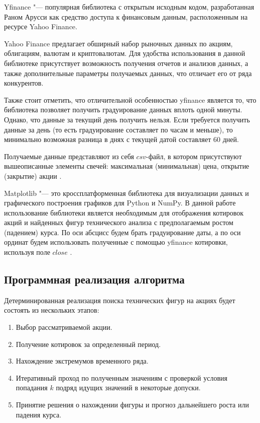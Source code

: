 \documentclass[bachelor, och, coursework]{SCWorks}
\begin{document}
        Yfinance "--- популярная библиотека с открытым исходным кодом,
        разработанная Раном Арусси как средство доступа к финансовым данным,
        расположенным на ресурсе Yahoo Finance.

        Yahoo Finance предлагает обширный набор рыночных данных по акциям,
        облигациям, валютам и криптовалютам. Для удобства использования в данной
        библиотеке присутствует возможность получения отчетов и анализов данных,
        а также дополнительные параметры получаемых данных, что отличает его от
        ряда конкурентов.

        Также стоит отметить, что отличительной особенностью yfinance является
        то, что библиотека позволяет получить градуирование данных вплоть одной
        минуты. Однако, что данные за текущий день получить нельзя. Если
        требуется получить данные за день (то есть градуирование составляет по
        часам и меньше), то минимально возможная разница в днях с текущей датой
        составляет 60 дней.

        Получаемые данные представляют из себя $csv$-файл, в котором
        присутствуют вышеописанные элементы свечей: максимальная (минимальная)
        цена, открытие (закрытие) акции \cite{YFLIB}.

        
        Matplotlib "--- это кроссплатформенная библиотека для визуализации
        данных и графического построения графиков для Python и NumPy. В данной
        работе использование библиотеки является необходимым для отображения
        котировок акций и найденных фигур технического анализа с предполагаемым
        ростом (падением) курса. По оси абсцисс будем брать градуирование даты,
        а по оси ординат будем использовать полученные с помощью yfinance
        котировки, используя поле $close$ \cite{tosi2009matplotlib}.


    \subsection{Программная реализация алгоритма}
    
    Детерминированная реализация поиска технических фигур на акциях будет
    состоять из нескольких этапов:
    \begin{enumerate}
        \item Выбор рассматриваемой акции.
        \item Получение котировок за определенный период.
        \item Нахождение экстремумов временного ряда.
        \item Итеративный проход по полученным значениям с проверкой условия
        попадания $k$ подряд идущих значений в некоторые допуски.
        \item Принятие решения о нахождении фигуры и прогноз дальнейшего роста
        или падения курса.
    \end{enumerate}
          
\end{document}
